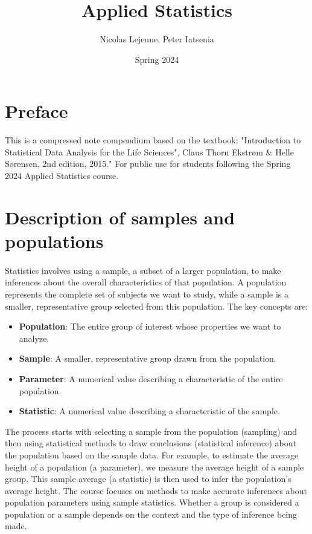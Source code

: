 \documentclass{article}
\title{Applied Statistics}
\author{Nicolas Lejeune, Peter Iatsenia}
\date{Spring 2024}
\begin{document}
\maketitle

\tableofcontents

\pagebreak

\section*{Preface}
This is a compressed note compendium based on the textbook: "Introduction to Statistical Data Analysis for the Life Sciences", Claus Thorn Ekstrøm \& Helle Sørensen, 2nd edition, 2015." For public use for students following the Spring 2024 Applied Statistics course.

\section{Description of samples and populations}

\paragraph{}
Statistics involves using a sample, a subset of a larger population, to make inferences about the overall characteristics of that population. A population represents the complete set of subjects we want to study, while a sample is a smaller, representative group selected from this population. The key concepts are:

\begin{itemize}
    \item \textbf{Population}: The entire group of interest whose properties we want to analyze.
    \item \textbf{Sample}: A smaller, representative group drawn from the population.
    \item \textbf{Parameter}: A numerical value describing a characteristic of the entire population.
    \item \textbf{Statistic}: A numerical value describing a characteristic of the sample.
\end{itemize}

The process starts with selecting a sample from the population (sampling) and then using statistical methods to draw conclusions (statistical inference) about the population based on the sample data. For example, to estimate the average height of a population (a parameter), we measure the average height of a sample group. This sample average (a statistic) is then used to infer the population's average height. The course focuses on methods to make accurate inferences about population parameters using sample statistics. Whether a group is considered a population or a sample depends on the context and the type of inference being made.
\end{document}
